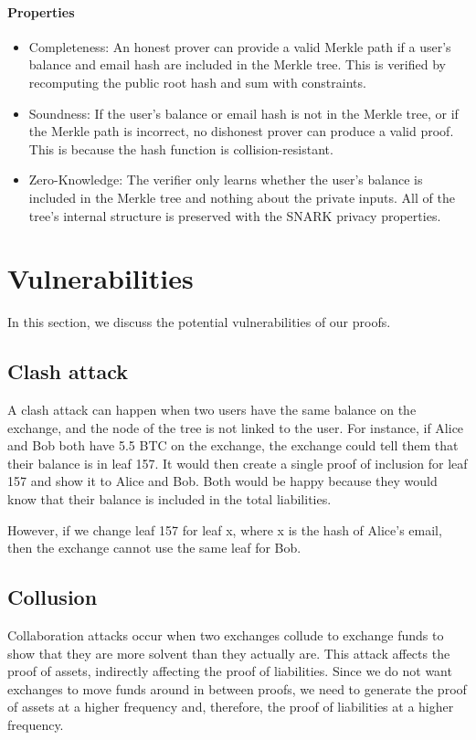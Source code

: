 \paragraph{Properties}
\begin{itemize}
   \item Completeness: An honest prover can provide a valid Merkle path if a user's balance and email hash are included in the Merkle tree. This is verified by recomputing the public root hash and sum with constraints.
   \item Soundness: If the user's balance or email hash is not in the Merkle tree, or if the Merkle path is incorrect, no dishonest prover can produce a valid proof. This is because the hash function is collision-resistant.
   \item Zero-Knowledge: The verifier only learns whether the user's balance is included in the Merkle tree and nothing about the private inputs. All of the tree's internal structure is preserved with the SNARK privacy properties.
   \end{itemize}

\section{Vulnerabilities}
In this section, we discuss the potential vulnerabilities of our proofs.

\subsection{Clash attack}
\label{subsec:ca}
A clash attack can happen when two users have the same balance on the exchange, and the node of the tree is not linked to the user. 
For instance, if Alice and Bob both have 5.5 BTC on the exchange, the exchange could tell them that their balance is in leaf 157. 
It would then create a single proof of inclusion for leaf 157 and show it to Alice and Bob. Both would be happy because they would know that their balance is included in the total liabilities.

However, if we change leaf 157 for leaf x, where x is the hash of Alice's email, then the exchange cannot use the same leaf for Bob.

\subsection{Collusion}
Collaboration attacks occur when two exchanges collude to exchange funds to show that they are more solvent than they actually are.
This attack affects the proof of assets, indirectly affecting the proof of liabilities. Since we do not want exchanges to move funds around in between proofs,
we need to generate the proof of assets at a higher frequency and, therefore, the proof of liabilities at a higher frequency.

